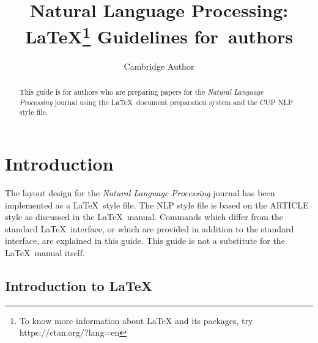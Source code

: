 \documentclass{CUP-JNL-NLP}
\begin{document}
\label{firstpage}



\jnlPage{\pageref{firstpage}}{\pageref{lastpage}}

\title{Natural Language Processing: \LaTeX\footnote{To know more information about LaTeX and its packages, try https://ctan.org/?lang=en} Guidelines for~authors}

\begin{authgrp}
\author{Cambridge Author}
\end{authgrp}


\begin{abstract}
This guide is for authors who are preparing papers for the {\em Natural Language Processing} journal using the \LaTeX\ document preparation
system and the CUP NLP style file.
\end{abstract}

\maketitle

\section{Introduction}

The layout design for the {\em Natural Language Processing} journal
has been implemented as a \LaTeX\ style file. The NLP style file is based
on the ARTICLE style as discussed in the \LaTeX\ manual. Commands which
differ from the standard \LaTeX\ interface, or which are provided in addition
to the standard interface, are explained in this guide. This guide is not a
substitute for the \LaTeX\ manual itself.

\subsection{Introduction to \LaTeX}
\end{document}
